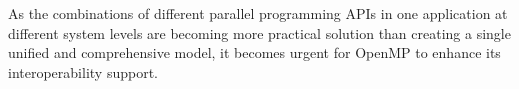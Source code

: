 


As the combinations of different parallel programming APIs in one application
at different system levels are becoming more
practical solution than creating a single unified and 
comprehensive model, it becomes urgent for OpenMP to enhance its 
interoperability support.








